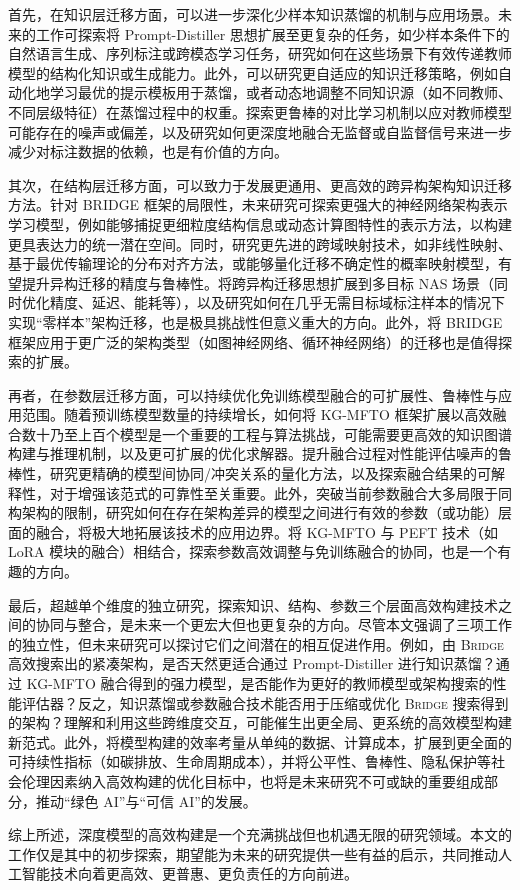 \documentclass[../main.tex]{subfiles}
\begin{document}
首先，在知识层迁移方面，可以进一步深化少样本知识蒸馏的机制与应用场景。未来的工作可探索将 Prompt-Distiller 思想扩展至更复杂的任务，如少样本条件下的自然语言生成、序列标注或跨模态学习任务，研究如何在这些场景下有效传递教师模型的结构化知识或生成能力。此外，可以研究更自适应的知识迁移策略，例如自动化地学习最优的提示模板用于蒸馏，或者动态地调整不同知识源（如不同教师、不同层级特征）在蒸馏过程中的权重。探索更鲁棒的对比学习机制以应对教师模型可能存在的噪声或偏差，以及研究如何更深度地融合无监督或自监督信号来进一步减少对标注数据的依赖，也是有价值的方向。

其次，在结构层迁移方面，可以致力于发展更通用、更高效的跨异构架构知识迁移方法。针对 BRIDGE 框架的局限性，未来研究可探索更强大的神经网络架构表示学习模型，例如能够捕捉更细粒度结构信息或动态计算图特性的表示方法，以构建更具表达力的统一潜在空间。同时，研究更先进的跨域映射技术，如非线性映射、基于最优传输理论的分布对齐方法，或能够量化迁移不确定性的概率映射模型，有望提升异构迁移的精度与鲁棒性。将跨异构迁移思想扩展到多目标 NAS 场景（同时优化精度、延迟、能耗等），以及研究如何在几乎无需目标域标注样本的情况下实现“零样本”架构迁移，也是极具挑战性但意义重大的方向。此外，将 BRIDGE 框架应用于更广泛的架构类型（如图神经网络、循环神经网络）的迁移也是值得探索的扩展。

再者，在参数层迁移方面，可以持续优化免训练模型融合的可扩展性、鲁棒性与应用范围。随着预训练模型数量的持续增长，如何将 KG-MFTO 框架扩展以高效融合数十乃至上百个模型是一个重要的工程与算法挑战，可能需要更高效的知识图谱构建与推理机制，以及更可扩展的优化求解器。提升融合过程对性能评估噪声的鲁棒性，研究更精确的模型间协同/冲突关系的量化方法，以及探索融合结果的可解释性，对于增强该范式的可靠性至关重要。此外，突破当前参数融合大多局限于同构架构的限制，研究如何在存在架构差异的模型之间进行有效的参数（或功能）层面的融合，将极大地拓展该技术的应用边界。将 KG-MFTO 与 PEFT 技术（如 LoRA 模块的融合）相结合，探索参数高效调整与免训练融合的协同，也是一个有趣的方向。

最后，超越单个维度的独立研究，探索知识、结构、参数三个层面高效构建技术之间的协同与整合，是未来一个更宏大但也更复杂的方向。尽管本文强调了三项工作的独立性，但未来研究可以探讨它们之间潜在的相互促进作用。例如，由 \textsc{Bridge} 高效搜索出的紧凑架构，是否天然更适合通过 Prompt-Distiller 进行知识蒸馏？通过 KG-MFTO 融合得到的强力模型，是否能作为更好的教师模型或架构搜索的性能评估器？反之，知识蒸馏或参数融合技术能否用于压缩或优化 \textsc{Bridge} 搜索得到的架构？理解和利用这些跨维度交互，可能催生出更全局、更系统的高效模型构建新范式。此外，将模型构建的效率考量从单纯的数据、计算成本，扩展到更全面的可持续性指标（如碳排放、生命周期成本），并将公平性、鲁棒性、隐私保护等社会伦理因素纳入高效构建的优化目标中，也将是未来研究不可或缺的重要组成部分，推动“绿色 AI”与“可信 AI”的发展。

综上所述，深度模型的高效构建是一个充满挑战但也机遇无限的研究领域。本文的工作仅是其中的初步探索，期望能为未来的研究提供一些有益的启示，共同推动人工智能技术向着更高效、更普惠、更负责任的方向前进。
\end{document}
